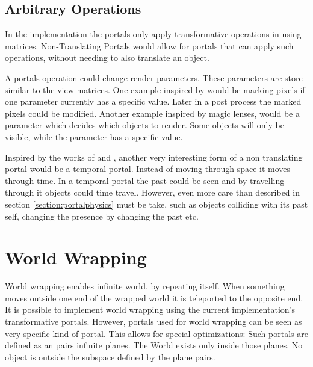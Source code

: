 \subsection{Arbitrary Operations}

In the implementation the portals only apply transformative operations in using matrices. Non-Translating Portals would allow for portals that can apply such operations, without needing to also translate an object.

A portals operation could change render parameters. These parameters are store similar to the view matrices. One example inspired by \cite{borst:2009:real} would be marking pixels if one parameter currently has a specific value. Later in a post process the marked pixels could be modified. Another example inspired by magic lenses, would be a parameter which decides which objects to render. Some objects will only be visible, while the parameter has a specific value.

Inspired by the works of \textcite{ryall:2005:temporal} and \textcite{tiesel:2009:composable}, another very interesting form of a non translating portal would be a temporal portal. Instead of moving through space it moves through time. In a temporal portal the past could be seen and by travelling through it objects could time travel. However, even more care than described in section \ref{section:portalphysics} must be take, such as objects colliding with its past self, changing the presence by changing the past etc.










\section{World Wrapping}
World wrapping enables infinite world, by repeating itself. When something moves outside one end of the wrapped world it is teleported to the opposite end. It is possible to implement world wrapping using the current implementation's transformative portals. However, portals used for world wrapping can be seen as very specific kind of portal. This allows for special optimizations: Such portals are defined as an pairs infinite planes. The World exists only inside those planes. No object is outside the subspace defined by the plane pairs. 


